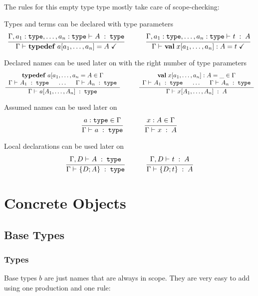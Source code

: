The rules for this empty type type mostly take care of scope-checking:
\begin{compactitem}
\item Types and terms can be declared with type parameters
\[
\rul{\oftype{}{\Gamma,a_1:\type,\ldots,a_n:\type}{A}{\type}}{\isdecl{}{\Gamma}{\atypedef{a[a_1,\ldots,a_n]}{A}}}
\tb\tb
\rul{\oftype{}{\Gamma,a_1:\type,\ldots,a_n:\type}{t}{A}}{\isdecl{}{\Gamma}{\aval{x[a_1,\ldots,a_n]}{A}{t}}}
\]
\item Declared names can be used later on with the right number of type parameters
\[\rul{\begin{array}{c}
         \atypedef{a[a_1,\ldots,a_n}{A}\in \Gamma \\
         \oftype{}{\Gamma}{A_1}{\type}\tb\ldots\tb \oftype{}{\Gamma}{A_n}{\type}
      \end{array}}
      {\oftype{}{\Gamma}{a[A_1,\ldots,A_n]}{\type}} \tb\tb
\rul{\begin{array}{c}
       \aval{x[a_1,\ldots,a_n]}{A}{\_}\in \Gamma \\
       \oftype{}{\Gamma}{A_1}{\type}\tb\ldots\tb \oftype{}{\Gamma}{A_n}{\type}
    \end{array}}
    {\oftype{}{\Gamma}{x[A_1,\ldots,A_n]}{A}}\]
\item Assumed names can be used later on
\[\rul{a:\type\in \Gamma}{\oftype{}{\Gamma}{a}{\type}} \tb\tb
\rul{x:A\in \Gamma}{\oftype{}{\Gamma}{x}{A}}\]
\item Local declarations can be used later on
\[\rul{\oftype{}{\Gamma,D}{A}{\type}}{\oftype{}{\Gamma}{\ablockI{D; A}}{\type}}
\tb\tb
\rul{\oftype{}{\Gamma,D}{t}{A}}{\oftype{}{\Gamma}{\ablockI{D; t}}{A}}\]
\end{compactitem}


\section{Concrete Objects}\label{sec:sd:typetheory:objects}

\subsection{Base Types}

\subsubsection{Types}

Base types $b$ are just names that are always in scope.
They are very easy to add using one production and one rule:

